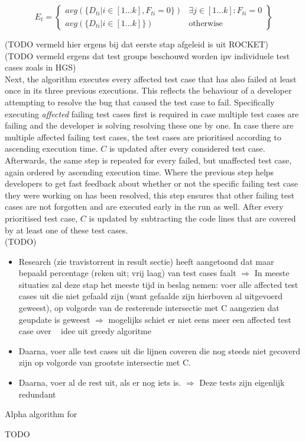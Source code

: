 \[
E_t = \left\{
\begin{array}{rl}
avg(\{D_{ti} \vert i \in [1 \dots k], F_{ti} = 0\}) & \exists j \in [1 \dots k] : F_{ti} = 0 \\
avg(\{D_{ti} \vert i \in [1 \dots k]\}) & \text{otherwise}
\end{array}
\right\}
\]

\noindent (TODO vermeld hier ergens bij dat eerste stap afgeleid is uit ROCKET)\\
\noindent (TODO vermeld ergens dat test groups beschouwd worden ipv individuele test cases zoals in HGS)\\

\noindent Next, the algorithm executes every affected test case that has also failed at least once in its three previous executions. This reflects the behaviour of a developer attempting to resolve the bug that caused the test case to fail. Specifically executing \emph{affected} failing test cases first is required in case multiple test cases are failing and the developer is solving resolving these one by one. In case there are multiple affected failing test cases, the test cases are prioritised according to ascending execution time. $C$ is updated after every considered test case.\\

\noindent Afterwards, the same step is repeated for every failed, but unaffected test case, again ordered by ascending execution time. Where the previous step helps developers to get fast feedback about whether or not the specific failing test case they were working on has been resolved, this step ensures that other failing test cases are not forgotten and are executed early in the run as well. After every prioritised test case, $C$ is updated by subtracting the code lines that are covered by at least one of these test cases.\\

(TODO)

\begin{itemize}
	\item Research (zie travistorrent in result sectie) heeft aangetoond dat maar bepaald percentage (reken uit; vrij laag) van test cases faalt $\Rightarrow$ In meeste situaties zal deze stap het meeste tijd in beslag nemen: voer alle affected test cases uit die niet gefaald zijn (want gefaalde zijn hierboven al uitgevoerd geweest), op volgorde van de resterende intersectie met C aangezien dat geupdate is geweest $\Rightarrow$ mogelijks schiet er niet eens meer een affected test case over ~ idee uit greedy algoritme
	
	\item Daarna, voer alle test cases uit die lijnen coveren die nog steeds niet gecoverd zijn op volgorde van grootste intersectie met C.
	
	\item Daarna, voer al de rest uit, als er nog iets is. $\Rightarrow$ Deze tests zijn eigenlijk redundant
\end{itemize}

\begin{algorithm}[h!]
	\caption{Alpha algorithm for \tcp{}}
	\label{alg:alpha}
	\begin{algorithmic}[1]
		\State TODO
	\end{algorithmic}
\end{algorithm}